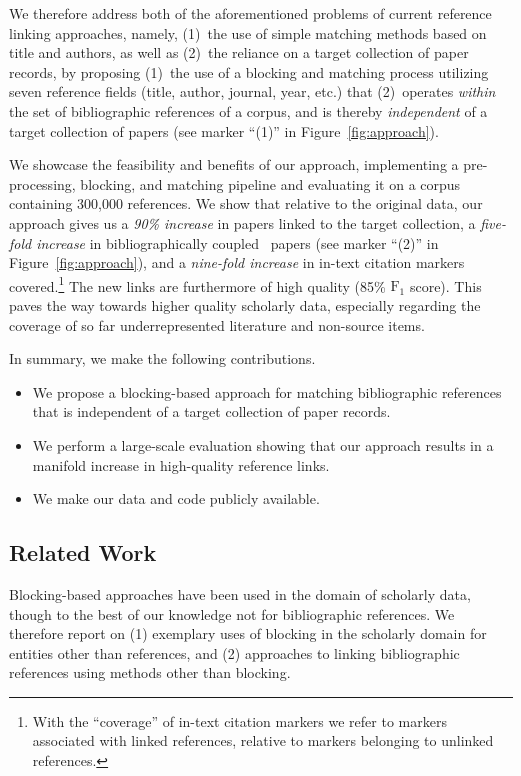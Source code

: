 We therefore address both of the aforementioned problems of current reference linking approaches, namely, (1)~the use of simple matching methods based on title and authors, as well as (2)~the reliance on a target collection of paper records, by proposing (1)~the use of a blocking and matching process utilizing seven reference fields (title, author, journal, year, etc.) that (2)~operates \emph{within} the set of bibliographic references of a corpus, and is thereby \emph{independent} of a target collection of papers (see marker ``(1)'' in Figure~\ref{fig:approach}).

We showcase the feasibility and benefits of our approach, implementing a pre-processing, blocking, and matching pipeline and evaluating it on a corpus containing 300,000 references.
We show that relative to the original data, our approach gives us a \emph{90\% increase} in papers linked to the target collection, a \emph{five-fold increase} in bibliographically coupled~\cite{Boyack2010} papers (see marker ``(2)'' in Figure~\ref{fig:approach}), and a \emph{nine-fold increase} in in-text citation markers covered.\footnote{With the ``coverage'' of in-text citation markers we refer to markers associated with linked references, relative to markers belonging to unlinked references.} The new links are furthermore of high quality (85\% $\text{F}_1$ score). This paves the way towards higher quality scholarly data, especially regarding the coverage of so far underrepresented literature and non-source items.

In summary, we make the following contributions.

\begin{itemize}
    \item We propose a blocking-based approach for matching bibliographic references that is independent of a target collection of paper records.
    \item We perform a large-scale evaluation showing that our approach results in a manifold increase in high-quality reference links.
    \item We make our data and code publicly available.
\end{itemize}

\subsection{Related Work}
Blocking-based approaches have been used in the domain of scholarly data, though to the best of our knowledge not for bibliographic references. We therefore report on (1) exemplary uses of blocking in the scholarly domain for entities other than references, and (2) approaches to linking bibliographic references using methods other than blocking.

